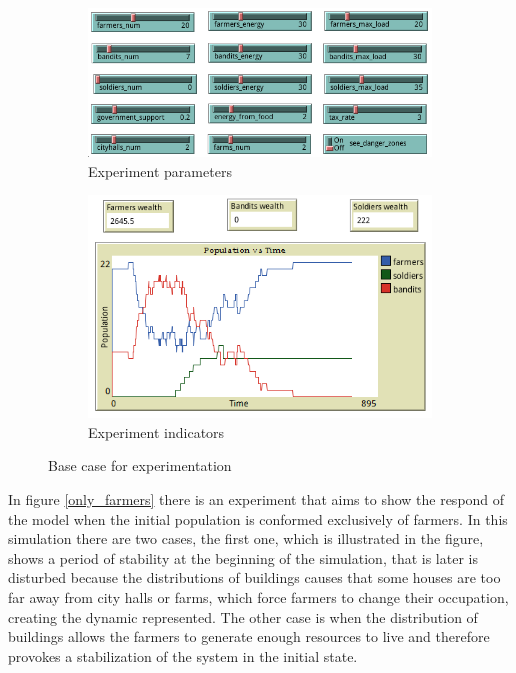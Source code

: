 \documentclass{wscpaperproc}
\begin{document}
\begin{figure}[h!]
    \begin{subfigure}{0.45\textwidth}
    \includegraphics[width=\textwidth]{Images/Exp1_sliders.png}
    \caption{Experiment parameters}
    \end{subfigure}
    \hfill
    \begin{subfigure}{0.45\textwidth}
    \includegraphics[width=\textwidth]{Images/Exp1_indicators.png}
    \caption{Experiment indicators}
    \end{subfigure}%
    \caption{Base case for experimentation}
    \label{base_experiment}
\end{figure}

In figure \ref{only_farmers} there is an experiment that aims to show the respond
of the model when the initial population is conformed exclusively of farmers. In
this simulation there are two cases, the first one, which is illustrated in the
figure, shows a period of stability at the beginning of the simulation, that is
later is disturbed because the distributions of buildings causes that
some houses are too far away from city halls or farms, which force
farmers to change their occupation, creating the dynamic represented. The other case
is when the distribution of buildings allows the farmers to generate enough
resources to live and therefore provokes a stabilization of the system in the
initial state.\\
\end{document}
